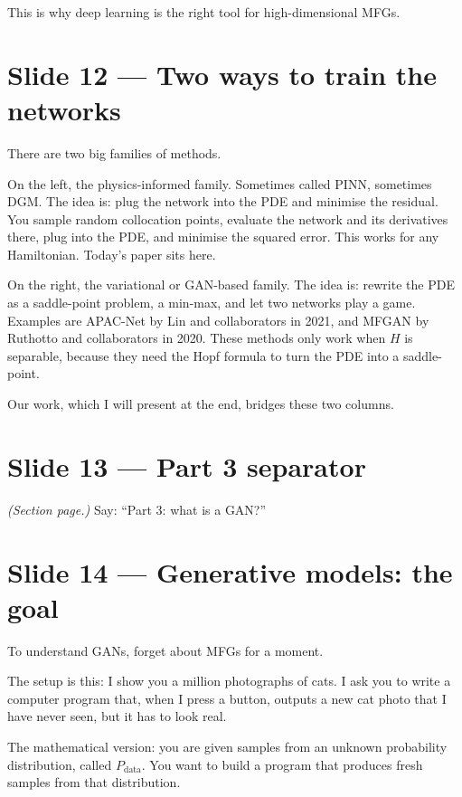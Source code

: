 \documentclass[11pt]{article}
\begin{document}
This is why deep learning is the right tool for high-dimensional MFGs.

\section*{Slide 12 --- Two ways to train the networks}

There are two big families of methods.

On the left, the physics-informed family. Sometimes called PINN, sometimes
DGM. The idea is: plug the network into the PDE and minimise the residual.
You sample random collocation points, evaluate the network and its
derivatives there, plug into the PDE, and minimise the squared error.
This works for any Hamiltonian. Today's paper sits here.

On the right, the variational or GAN-based family. The idea is: rewrite the
PDE as a saddle-point problem, a min-max, and let two networks play a game.
Examples are APAC-Net by Lin and collaborators in 2021, and MFGAN by
Ruthotto and collaborators in 2020. These methods only work when $H$ is
separable, because they need the Hopf formula to turn the PDE into a
saddle-point.

Our work, which I will present at the end, bridges these two columns.

\section*{Slide 13 --- Part 3 separator}

\textit{(Section page.)}  Say: ``Part 3: what is a GAN?''

\section*{Slide 14 --- Generative models: the goal}

To understand GANs, forget about MFGs for a moment.

The setup is this: I show you a million photographs of cats. I ask you to
write a computer program that, when I press a button, outputs a new cat
photo that I have never seen, but it has to look real.

The mathematical version: you are given samples from an unknown probability
distribution, called $P_\text{data}$. You want to build a program that
produces fresh samples from that distribution.
\end{document}
